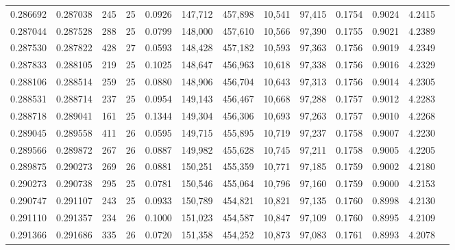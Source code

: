 \begin{tabular}{rrrrrrrrrrrrr}
0.286692 & 0.287038 &   245 &  25 &                                     0.0926 & 147,712 & 457,898 &  10,541 &  97,415 & 0.1754 & 0.9024 & 4.2415 \\
0.287044 & 0.287528 &   288 &  25 &                                     0.0799 & 148,000 & 457,610 &  10,566 &  97,390 & 0.1755 & 0.9021 & 4.2389 \\
0.287530 & 0.287822 &   428 &  27 &                                     0.0593 & 148,428 & 457,182 &  10,593 &  97,363 & 0.1756 & 0.9019 & 4.2349 \\
0.287833 & 0.288105 &   219 &  25 &                                     0.1025 & 148,647 & 456,963 &  10,618 &  97,338 & 0.1756 & 0.9016 & 4.2329 \\
0.288106 & 0.288514 &   259 &  25 &                                     0.0880 & 148,906 & 456,704 &  10,643 &  97,313 & 0.1756 & 0.9014 & 4.2305 \\
0.288531 & 0.288714 &   237 &  25 &                                     0.0954 & 149,143 & 456,467 &  10,668 &  97,288 & 0.1757 & 0.9012 & 4.2283 \\
0.288718 & 0.289041 &   161 &  25 &                                     0.1344 & 149,304 & 456,306 &  10,693 &  97,263 & 0.1757 & 0.9010 & 4.2268 \\
0.289045 & 0.289558 &   411 &  26 &                                     0.0595 & 149,715 & 455,895 &  10,719 &  97,237 & 0.1758 & 0.9007 & 4.2230 \\
0.289566 & 0.289872 &   267 &  26 &                                     0.0887 & 149,982 & 455,628 &  10,745 &  97,211 & 0.1758 & 0.9005 & 4.2205 \\
0.289875 & 0.290273 &   269 &  26 &                                     0.0881 & 150,251 & 455,359 &  10,771 &  97,185 & 0.1759 & 0.9002 & 4.2180 \\
0.290273 & 0.290738 &   295 &  25 &                                     0.0781 & 150,546 & 455,064 &  10,796 &  97,160 & 0.1759 & 0.9000 & 4.2153 \\
0.290747 & 0.291107 &   243 &  25 &                                     0.0933 & 150,789 & 454,821 &  10,821 &  97,135 & 0.1760 & 0.8998 & 4.2130 \\
0.291110 & 0.291357 &   234 &  26 &                                     0.1000 & 151,023 & 454,587 &  10,847 &  97,109 & 0.1760 & 0.8995 & 4.2109 \\
0.291366 & 0.291686 &   335 &  26 &                                     0.0720 & 151,358 & 454,252 &  10,873 &  97,083 & 0.1761 & 0.8993 & 4.2078 \\

\end{tabular}
